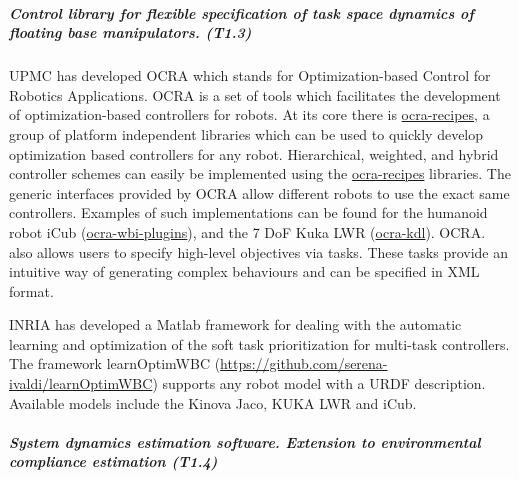 \subparagraph*{Control library for flexible specification of task space
  dynamics of floating base manipulators. (T1.3)}


UPMC has developed OCRA which stands for Optimization-based Control for Robotics Applications. OCRA is a set of tools which facilitates the development of optimization-based controllers for robots. At its core there is \href{https://github.com/ocra-recipes/ocra-recipes}{ocra-recipes}, a group of platform independent libraries which can be used to quickly develop optimization based controllers for any robot. Hierarchical, weighted, and hybrid controller schemes can easily be implemented using the \href{https://github.com/ocra-recipes/ocra-recipes}{ocra-recipes} libraries. The generic interfaces provided by OCRA allow different robots to use the exact same controllers. Examples of such implementations can be found for the humanoid robot iCub (\href{https://github.com/ocra-recipes/ocra-wbi-plugins}{ocra-wbi-plugins}), and the 7 DoF Kuka LWR (\href{https://github.com/kuka-isir/ocra-kdl}{ocra-kdl}). OCRA. also allows users to specify high-level objectives via tasks. These tasks provide an intuitive way of generating complex behaviours and can be specified in XML format.


INRIA has developed a Matlab framework for dealing with the automatic learning and optimization of the soft task prioritization for multi-task controllers. The framework learnOptimWBC (\url{https://github.com/serena-ivaldi/learnOptimWBC}) supports any robot model with a URDF description. Available models include the Kinova Jaco, KUKA LWR and iCub.


\subparagraph*{System dynamics estimation software. Extension to
environmental compliance estimation (T1.4)}

